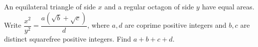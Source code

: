An equilateral triangle of side $x$ and a regular octagon of side $y$ have equal areas. Write $\dfrac{x^2}{y^2}=\dfrac{a(\sqrt b+\sqrt c)}{d}$, where $a,d$ are coprime positive integers and $b,c$ are distinct squarefree positive integers. Find $a+b+c+d$.

